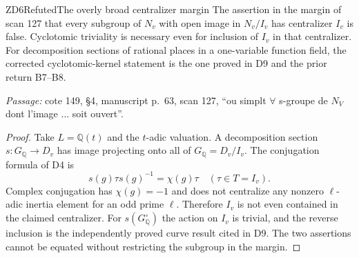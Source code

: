 \begin{result}{ZD6}{Refuted}{The overly broad centralizer margin}
The assertion in the margin of scan 127 that every subgroup of $N_v$ with open image in $N_v/I_v$ has centralizer $I_v$ is false. Cyclotomic triviality is necessary even for inclusion of $I_v$ in that centralizer. For decomposition sections of rational places in a one-variable function field, the corrected cyclotomic-kernel statement is the one proved in D9 and the prior return B7--B8.
\par\emph{Passage:} cote 149, \S4, manuscript p.~63, scan 127, ``ou simplt $\forall$ s-groupe de $N_V$ dont l'image ... soit ouvert''.
\end{result}
\begin{proof}
Take $L=\mathbb Q(t)$ and the $t$-adic valuation. A decomposition section $s:G_{\mathbb Q}\to D_v$ has image projecting onto all of $G_{\mathbb Q}=D_v/I_v$. The conjugation formula of D4 is
\[
 s(g)\tau s(g)^{-1}=\chi(g)\tau\quad(\tau\in T=I_v).
\]
Complex conjugation has $\chi(g)=-1$ and does not centralize any nonzero $\ell$-adic inertia element for an odd prime $\ell$. Therefore $I_v$ is not even contained in the claimed centralizer. For $s(G_{\mathbb Q}^{\circ})$ the action on $I_v$ is trivial, and the reverse inclusion is the independently proved curve result cited in D9. The two assertions cannot be equated without restricting the subgroup in the margin.
\end{proof}

